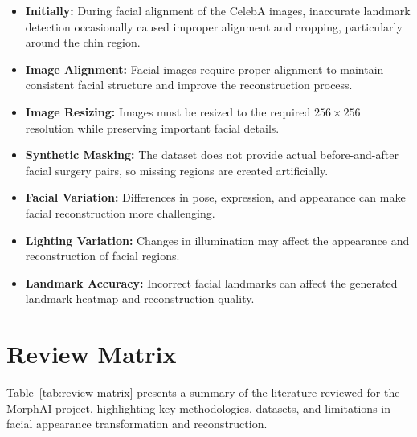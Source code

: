 \begin{itemize}
    \item \textbf{Initially:} During facial alignment of the CelebA
    images, inaccurate landmark detection occasionally caused improper
    alignment and cropping, particularly around the chin region.
    
    \item \textbf{Image Alignment:} Facial images require proper alignment
    to maintain consistent facial structure and improve the reconstruction
    process.

    \item \textbf{Image Resizing:} Images must be resized to the required
    $256 \times 256$ resolution while preserving important facial details.

    

    \item \textbf{Synthetic Masking:} The dataset does not provide actual
    before-and-after facial surgery pairs, so missing regions are created
    artificially.

    \item \textbf{Facial Variation:} Differences in pose, expression, and
    appearance can make facial reconstruction more challenging.

    \item \textbf{Lighting Variation:} Changes in illumination may affect
    the appearance and reconstruction of facial regions.

    \item \textbf{Landmark Accuracy:} Incorrect facial landmarks can affect
    the generated landmark heatmap and reconstruction quality.

\end{itemize}



\section{Review Matrix}

\setlength{\LTpre}{0pt}
\setlength{\LTpost}{0pt}
\renewcommand{\arraystretch}{1.3}
\noindent Table~\ref{tab:review-matrix} presents a summary of the literature reviewed for the MorphAI project, highlighting key methodologies, datasets, and limitations in facial appearance transformation and reconstruction.






